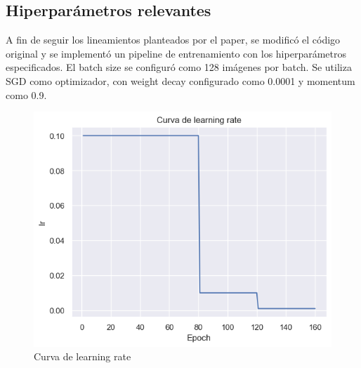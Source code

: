 \documentclass[titlepage,a4paper,oneside]{article}
\begin{document}
\subsection{Hiperparámetros relevantes}
A fin de seguir los lineamientos planteados por el paper, se modificó el código original y se implementó un pipeline de entrenamiento con los hiperparámetros especificados. El batch size se configuró como 128 imágenes por batch. Se utiliza SGD como optimizador, con weight decay  configurado como 0.0001 y momentum como 0.9.

\begin{figure}[H]
\centering
\includegraphics[width=\textwidth]{images/lr_curve.png}
\caption{Curva de learning rate}
\end{figure}

\printbibliography
\end{document}
